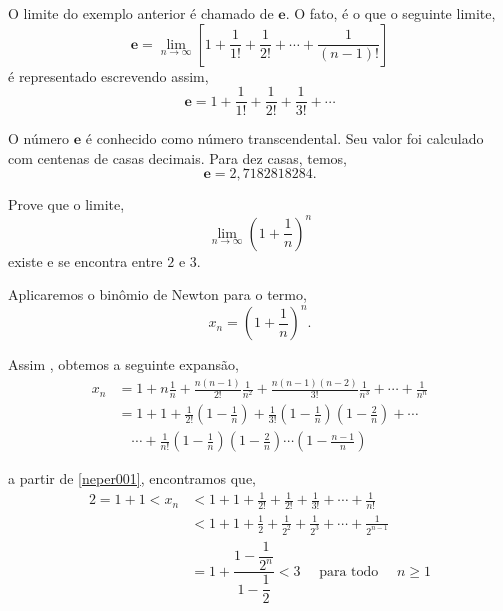 \begin{obs}
O limite do exemplo anterior \'{e} chamado de $\mathbf{e}$. O fato, \'{e} o que o seguinte limite,
\begin{equation*}
    \mathbf{e}=\lim_{n\to\infty}\left[1+\frac{1}{1!}+\frac{1}{2!}+\cdots+\frac{1}{(n-1)!} \right]
\end{equation*}
\'{e} representado escrevendo assim,
\begin{equation*}
    \mathbf{e}=1+\frac{1}{1!}+\frac{1}{2!}+\frac{1}{3!}+\cdots
\end{equation*}

O n\'{u}mero $\mathbf{e}$ \'{e} conhecido como n\'{u}mero transcendental. Seu valor foi calculado com centenas de casas decimais. Para dez casas, temos,
\begin{equation*}
    \mathbf{e}=2,7182818284.
\end{equation*}
\end{obs}

\begin{exer}
Prove que o limite,
\begin{equation*}
    \lim_{n\to\infty}\left( 1+\frac{1}{n}\right)^n
\end{equation*}
existe e se encontra entre $2$ e $3$.
\end{exer}

\solo Aplicaremos o bin\^{o}mio de Newton para o termo,
\begin{equation*}
    x_n=\left( 1+\frac{1}{n}\right)^n.
\end{equation*}

Assim , obtemos a seguinte expans\~{a}o,
\begin{align}
    x_n&=1+n\frac{1}{n}+\frac{n(n-1)}{2!}\frac{1}{n^2}+\frac{n(n-1)(n-2)}{3!}\frac{1}{n^3}+\cdots+\frac{1}{n^n}\nonumber\\[2ex]
   &=1+1+\frac{1}{2!}\left(1-\frac{1}{n}\right)+\frac{1}{3!}\left(1-\frac{1}{n}\right)\left(1-\frac{2}{n}\right)+\cdots \nonumber\\[2ex]
&\quad \cdots +\frac{1}{n!}\left(1-\frac{1}{n}\right)\left(1-\frac{2}{n}\right)\cdots\left(1-\frac{n-1}{n}\right) \label{neper001}
\end{align}

a partir de \eqref{neper001}, encontramos que,
\begin{align}
 2=1+1<x_n &<1+1+\frac{1}{2!}+\frac{1}{2!}+\frac{1}{3!}+\cdots+\frac{1}{n!}\nonumber\\[2ex]
       &<1+1+\frac{1}{2}+\frac{1}{2^2}+\frac{1}{2^3}+\cdots+\frac{1}{2^{n-1}}\nonumber\\[2ex]
    &=1+\dfrac{1-\dfrac{1}{2^n}}{1-\dfrac{1}{2}}<3\quad \text{ para todo }\quad n\geq 1 \label{neper002}
\end{align}

